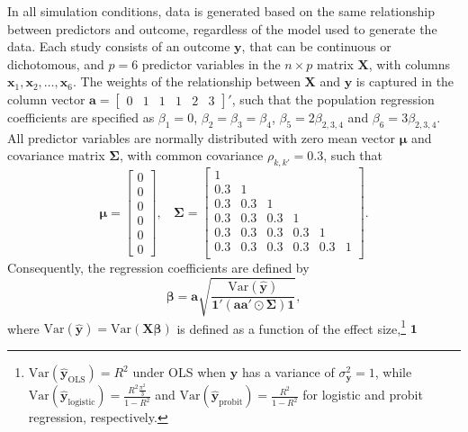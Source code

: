 \documentclass[
]{interact}
\begin{document}
In all simulation conditions, data is generated based on the same
relationship between predictors and outcome, regardless of the model
used to generate the data. Each study consists of an outcome
\(\boldsymbol{y}\), that can be continuous or dichotomous, and \(p = 6\)
predictor variables in the \(n \times p\) matrix \(\boldsymbol{X}\),
with columns
\(\boldsymbol{x}_1, \boldsymbol{x}_2, \dots, \boldsymbol{x}_6\). The
weights of the relationship between \(\boldsymbol{X}\) and
\(\boldsymbol{y}\) is captured in the column vector
\(\boldsymbol{a} = \begin{bmatrix} 0 & 1 & 1 & 1 & 2 & 3 \end{bmatrix}'\),
such that the population regression coefficients are specified as
\(\beta_1 = 0\), \(\beta_2 = \beta_3 = \beta_4\),
\(\beta_5 = 2\beta_{2,3,4}\) and \(\beta_6 = 3\beta_{2,3,4}\). All
predictor variables are normally distributed with zero mean vector
\(\boldsymbol{\mu}\) and covariance matrix \(\boldsymbol{\Sigma}\), with
common covariance \(\rho_{k,k'}=0.3\), such that \[
\boldsymbol{\mu} = 
\begin{bmatrix}
0 \\ 0 \\ 0 \\ 0 \\ 0 \\ 0
\end{bmatrix}, 
~~~~
\boldsymbol{\Sigma} = 
\begin{bmatrix}
1 &  &  &  &  &  \\ 
0.3 & 1 &  &  &  &  \\ 
0.3 & 0.3 & 1 &  &  &  \\ 
0.3 & 0.3 & 0.3 & 1 &  &  \\ 
0.3 & 0.3 & 0.3 & 0.3 & 1 &  \\ 
0.3 & 0.3 & 0.3 & 0.3 & 0.3 & 1  \\ 
\end{bmatrix}.
\] Consequently, the regression coefficients are defined by \[
\boldsymbol{\beta} = \boldsymbol{a} 
  \sqrt{
    \frac{\text{Var}(\boldsymbol{\hat{y}})}{\boldsymbol{1'}(\boldsymbol{a} \boldsymbol{a'}\odot\boldsymbol{\Sigma})\boldsymbol{1}}
  },
\] where
\(\text{Var}(\boldsymbol{\hat{y}}) = \text{Var}(\boldsymbol{X\beta})\)
is defined as a function of the effect size,\footnote{
  \(\text{Var}(\boldsymbol{\hat{y}}_{\text{OLS}}) = R^2\) under OLS when
  \(\boldsymbol{y}\) has a variance of
  \(\sigma_{\boldsymbol{y}}^2 = 1\), while
  \(\text{Var}(\boldsymbol{\hat{y}}_{\text{logistic}}) = \frac{R^2\frac{\pi^2}{3}}{1 - R^2}\)
  and
  \(\text{Var}(\boldsymbol{\hat{y}}_{\text{probit}}) = \frac{R^2}{1-R^2}\)
  for logistic and probit regression, respectively.} \(\boldsymbol{1}\)
\end{document}
